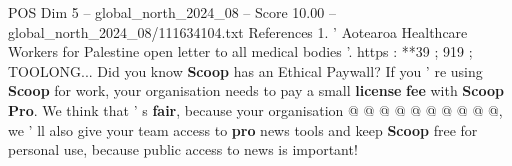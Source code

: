 \begin{textsample}{POS Dim 5 – global\_north\_2024\_08 – Score 10.00 – global\_north\_2024\_08/111634104.txt}
References 1. ' Aotearoa Healthcare Workers for Palestine open letter to all medical bodies '. https : **39 ; 919 ; TOOLONG...
Did you know \textbf{Scoop} has an Ethical Paywall?
If you ' re using \textbf{Scoop} for work, your organisation needs to pay a small \textbf{license} \textbf{fee} with \textbf{Scoop} \textbf{Pro}.
We think that ' s \textbf{fair}, because your organisation @ @ @ @ @ @ @ @ @ @, we ' ll also give your team access to \textbf{pro} news tools and keep \textbf{Scoop} free for personal use, because public access to news is important!

\end{textsample}
